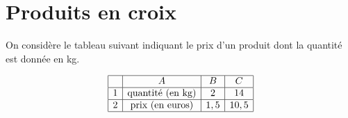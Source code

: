 \documentclass{article}
\begin{document}
\section{Produits en croix}

On considère le tableau suivant indiquant le prix d'un produit dont la quantité est donnée en kg.



\begin{equation*}
  \begin{array}{|c|c|c|c|}
    \hline
    & A & B & C \\
    \hline
    1 & \textrm{quantité (en kg)} & 2 & 14 \\
    \hline
    2 & \textrm{prix (en euros)} & 1,5 & 10,5 \\
    \hline
  \end{array}
\end{equation*}
\end{document}
